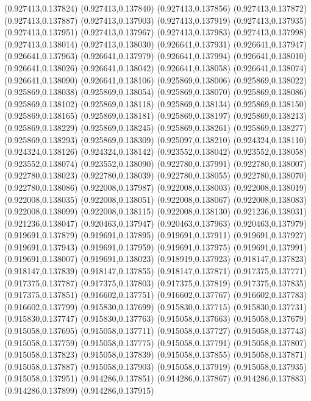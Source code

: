 (0.927413,0.137824)
(0.927413,0.137840)
(0.927413,0.137856)
(0.927413,0.137872)
(0.927413,0.137887)
(0.927413,0.137903)
(0.927413,0.137919)
(0.927413,0.137935)
(0.927413,0.137951)
(0.927413,0.137967)
(0.927413,0.137983)
(0.927413,0.137998)
(0.927413,0.138014)
(0.927413,0.138030)
(0.926641,0.137931)
(0.926641,0.137947)
(0.926641,0.137963)
(0.926641,0.137979)
(0.926641,0.137994)
(0.926641,0.138010)
(0.926641,0.138026)
(0.926641,0.138042)
(0.926641,0.138058)
(0.926641,0.138074)
(0.926641,0.138090)
(0.926641,0.138106)
(0.925869,0.138006)
(0.925869,0.138022)
(0.925869,0.138038)
(0.925869,0.138054)
(0.925869,0.138070)
(0.925869,0.138086)
(0.925869,0.138102)
(0.925869,0.138118)
(0.925869,0.138134)
(0.925869,0.138150)
(0.925869,0.138165)
(0.925869,0.138181)
(0.925869,0.138197)
(0.925869,0.138213)
(0.925869,0.138229)
(0.925869,0.138245)
(0.925869,0.138261)
(0.925869,0.138277)
(0.925869,0.138293)
(0.925869,0.138309)
(0.925097,0.138210)
(0.924324,0.138110)
(0.924324,0.138126)
(0.924324,0.138142)
(0.923552,0.138042)
(0.923552,0.138058)
(0.923552,0.138074)
(0.923552,0.138090)
(0.922780,0.137991)
(0.922780,0.138007)
(0.922780,0.138023)
(0.922780,0.138039)
(0.922780,0.138055)
(0.922780,0.138070)
(0.922780,0.138086)
(0.922008,0.137987)
(0.922008,0.138003)
(0.922008,0.138019)
(0.922008,0.138035)
(0.922008,0.138051)
(0.922008,0.138067)
(0.922008,0.138083)
(0.922008,0.138099)
(0.922008,0.138115)
(0.922008,0.138130)
(0.921236,0.138031)
(0.921236,0.138047)
(0.920463,0.137947)
(0.920463,0.137963)
(0.920463,0.137979)
(0.919691,0.137879)
(0.919691,0.137895)
(0.919691,0.137911)
(0.919691,0.137927)
(0.919691,0.137943)
(0.919691,0.137959)
(0.919691,0.137975)
(0.919691,0.137991)
(0.919691,0.138007)
(0.919691,0.138023)
(0.918919,0.137923)
(0.918147,0.137823)
(0.918147,0.137839)
(0.918147,0.137855)
(0.918147,0.137871)
(0.917375,0.137771)
(0.917375,0.137787)
(0.917375,0.137803)
(0.917375,0.137819)
(0.917375,0.137835)
(0.917375,0.137851)
(0.916602,0.137751)
(0.916602,0.137767)
(0.916602,0.137783)
(0.916602,0.137799)
(0.915830,0.137699)
(0.915830,0.137715)
(0.915830,0.137731)
(0.915830,0.137747)
(0.915830,0.137763)
(0.915058,0.137663)
(0.915058,0.137679)
(0.915058,0.137695)
(0.915058,0.137711)
(0.915058,0.137727)
(0.915058,0.137743)
(0.915058,0.137759)
(0.915058,0.137775)
(0.915058,0.137791)
(0.915058,0.137807)
(0.915058,0.137823)
(0.915058,0.137839)
(0.915058,0.137855)
(0.915058,0.137871)
(0.915058,0.137887)
(0.915058,0.137903)
(0.915058,0.137919)
(0.915058,0.137935)
(0.915058,0.137951)
(0.914286,0.137851)
(0.914286,0.137867)
(0.914286,0.137883)
(0.914286,0.137899)
(0.914286,0.137915)
